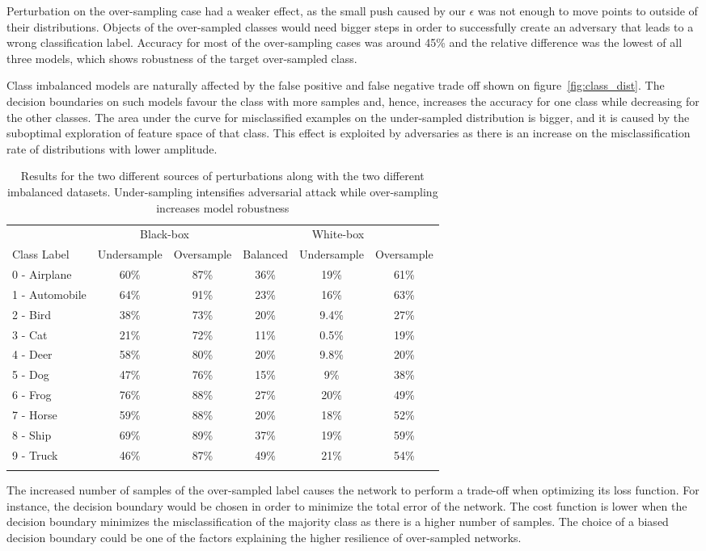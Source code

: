 \documentclass[runningheads,a4paper]{llncs}
\begin{document}
Perturbation on the over-sampling case had a weaker effect, as the small push caused by our $\epsilon$ was not enough to move points to outside of their distributions. Objects of the over-sampled classes would need bigger steps in order to successfully create an adversary that leads to a wrong classification label. Accuracy for most of the over-sampling cases was around 45\% and the relative difference was the lowest of all three models, which shows robustness of the target over-sampled class. 


Class imbalanced models are naturally affected by the false positive and false negative trade off shown on figure~\ref{fig:class_dist}. The decision boundaries on such models favour the class with more samples and, hence, increases the accuracy for one class while decreasing for the other classes. The area under the curve for misclassified examples on the under-sampled distribution is bigger, and it is caused by the suboptimal exploration of feature space of that class. This effect is exploited by adversaries as there is an increase on the misclassification rate of distributions with lower amplitude.
\begin{table}
	\centering	
	\begin{tabular}{lccccc}
		\toprule
		&\multicolumn{2}{c}{Black-box}
		&\multicolumn{3}{c}{White-box}
		\\\cmidrule(r){2-3}\cmidrule(l){4-6}
		Class Label &Undersample &Oversample &Balanced &Undersample &Oversample \\
		\midrule
		0 - Airplane &60\%& 87\% &36\%& 19\%    & 61\% \\
		1 - Automobile &64\%& 91\% &23\%& 16\%    & 63\% \\
		2 - Bird &38\%& 73\% &20\%& 9.4\%    & 27\% \\
		3 - Cat &21\%& 72\% &11\%& 0.5\%    & 19\% \\
		4 - Deer &58\%& 80\% &20\%& 9.8\%    & 20\% \\
		5 - Dog &47\%& 76\% &15\%& 9\%    & 38\% \\
		6 - Frog &76\%& 88\% &27\%& 20\%    & 49\% \\
		7 - Horse &59\%& 88\% &20\%& 18\%    & 52\% \\
		8 - Ship &69\%& 89\% &37\%& 19\%    & 59\% \\
		9 - Truck &46\%& 87\% &49\%& 21\%    & 54\% \\
		\bottomrule
		\hfill
	\end{tabular}
	\caption{Results for the two different sources of perturbations along with the two different imbalanced datasets. Under-sampling intensifies adversarial attack while over-sampling increases model robustness}
	\label{tbl:results}
\end{table}
The increased number of samples of the over-sampled label causes the network to perform a trade-off when optimizing its loss function. For instance, the decision boundary would be chosen in order to minimize the total error of the network. The cost function is lower when the decision boundary minimizes the misclassification of the majority class as there is a higher number of samples. The choice of a biased decision boundary could be one of the factors explaining the higher resilience of over-sampled networks.
\end{document}
